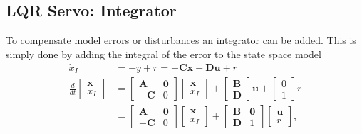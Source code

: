 \textbf{} 

\subsection{LQR Servo: Integrator}
To compensate model errors or disturbances an integrator can be added.
This is simply done by adding the integral of the error to the state space model
\noindent\begin{align*}
    \dot{x}_I & =-y+r =  -\mathbf{Cx} - \mathbf{Du} + r \\
    \frac d{dt}
    \begin{bmatrix}
        \mathbf{x} \\
        x_I
    \end{bmatrix}
              & =\begin{bmatrix}
                     \mathbf{A}  & \mathbf{0} \\
                     -\mathbf{C} & 0
                 \end{bmatrix}
    \begin{bmatrix}
        \mathbf{x} \\
        x_I
    \end{bmatrix}
    +\begin{bmatrix}
         \mathbf{B} \\
         \mathbf{D}
     \end{bmatrix}
    \mathbf{u}+
    \begin{bmatrix}
        0 \\
        1
    \end{bmatrix}
    r                                                   \\
              & =\begin{bmatrix}
                     \mathbf{A}  & \mathbf{0} \\
                     -\mathbf{C} & 0
                 \end{bmatrix}
    \begin{bmatrix}
        \mathbf{x} \\
        x_I
    \end{bmatrix}
    +\begin{bmatrix}
         \mathbf{B} & \mathbf{0} \\
         \mathbf{D} & 1
     \end{bmatrix}
    \begin{bmatrix}
        \mathbf{u} \\
        r
    \end{bmatrix},
\end{align*}
